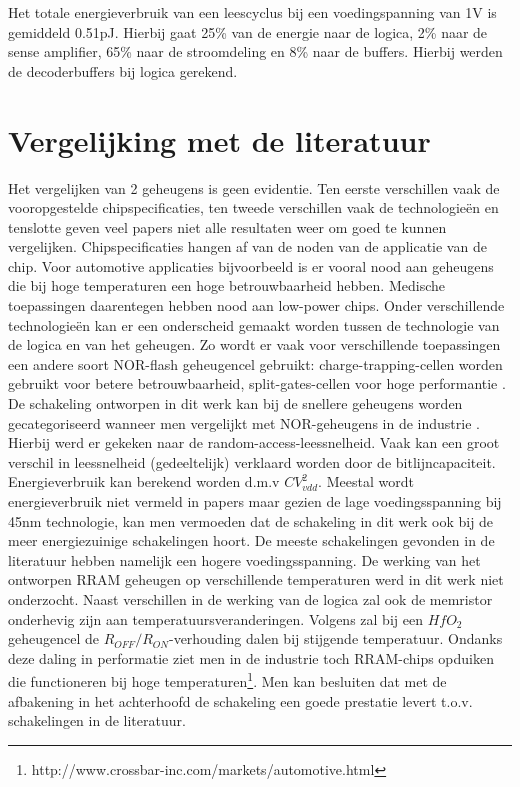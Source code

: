 Het totale energieverbruik van een leescyclus bij een voedingspanning van 1V is gemiddeld 0.51pJ. Hierbij gaat 25\% van de energie naar de logica, 2\% naar de sense amplifier, 65\% naar de stroomdeling en 8\% naar de buffers. Hierbij werden de decoderbuffers bij logica gerekend.

\section{Vergelijking met de literatuur}
Het vergelijken van 2 geheugens is geen evidentie. Ten eerste verschillen vaak de vooropgestelde chipspecificaties, ten tweede verschillen vaak de technologieën en tenslotte geven veel papers niet alle resultaten weer om goed te kunnen vergelijken. Chipspecificaties hangen af van de noden van de applicatie van de chip. Voor automotive applicaties bijvoorbeeld is er vooral nood aan geheugens die bij hoge temperaturen een hoge betrouwbaarheid hebben. Medische toepassingen daarentegen hebben  nood aan low-power chips. Onder verschillende technologieën kan er een onderscheid gemaakt worden tussen de technologie van de logica en van het geheugen. Zo wordt er vaak voor verschillende toepassingen een andere soort NOR-flash geheugencel gebruikt: charge-trapping-cellen worden gebruikt voor betere betrouwbaarheid, split-gates-cellen voor hoge performantie \cite{5783209}. De schakeling ontworpen in dit werk kan bij de snellere geheugens worden gecategoriseerd wanneer men vergelijkt met NOR-geheugens in de industrie \cite{6649105}\cite{4433985}\cite{4027813}. Hierbij werd er gekeken naar de random-access-leessnelheid. Vaak kan een groot verschil in leessnelheid (gedeeltelijk) verklaard worden door de bitlijncapaciteit. \\ 
Energieverbruik kan berekend worden d.m.v $CV_{vdd}^{2}$. Meestal wordt energieverbruik niet vermeld in papers maar gezien de lage voedingsspanning bij 45nm technologie, kan men vermoeden dat de schakeling in dit werk ook bij de meer energiezuinige schakelingen hoort. De meeste schakelingen gevonden in de literatuur hebben namelijk een hogere voedingsspanning. De werking van het ontworpen RRAM geheugen op verschillende temperaturen werd in dit werk niet onderzocht. Naast verschillen in de werking van de logica zal ook de memristor onderhevig zijn aan temperatuursveranderingen. Volgens \cite{5948374} zal bij een $HfO_{2}$ geheugencel de $R_{OFF}/R_{ON}$-verhouding dalen bij stijgende temperatuur. Ondanks deze daling in performatie ziet men in de industrie toch RRAM-chips opduiken die functioneren bij hoge temperaturen\footnote{http://www.crossbar-inc.com/markets/automotive.html}. Men kan besluiten dat met de afbakening in het achterhoofd de schakeling een goede prestatie levert t.o.v. schakelingen in de literatuur.


